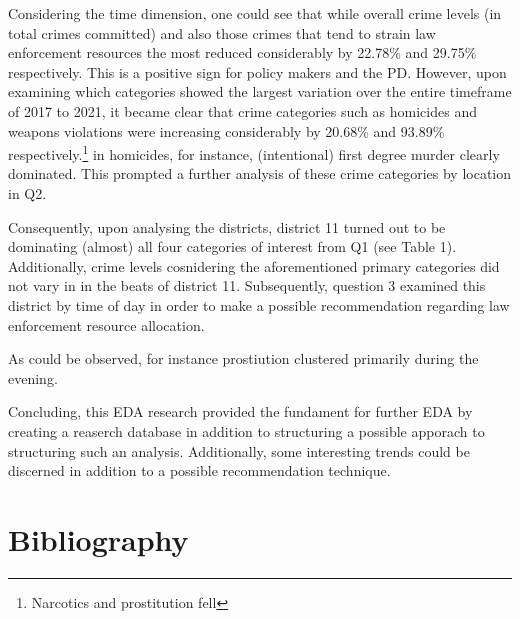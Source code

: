 \documentclass[a4paper]{article}
\begin{document}
\indent Considering the time dimension, one could see that while overall crime levels (in total crimes committed) and also those crimes that tend to strain law enforcement resources the most reduced considerably by 22.78\% and 29.75\% respectively. This is a positive sign for policy makers and the PD. However, upon examining which categories showed the largest variation over the entire timeframe of 2017 to 2021, it became clear that crime categories such as homicides and weapons violations were increasing considerably by 20.68\% and 93.89\% respectively.\footnote{Narcotics and prostitution fell} in homicides, for instance, (intentional) first degree murder clearly dominated. This prompted a further analysis of these crime categories by location in Q2.

\indent Consequently, upon analysing the districts, district 11 turned out to be dominating (almost) all four categories of interest from Q1 (see Table 1). Additionally, crime levels cosnidering the aforementioned primary categories did not vary in in the beats of district 11. Subsequently, question 3 examined this district by time of day in order to make a possible recommendation regarding law enforcement resource allocation.

\indent As could be observed, for instance prostiution clustered primarily during the evening.

Concluding, this EDA research provided the fundament for further EDA by creating a reaserch database in addition to structuring a possible apporach to structuring such an analysis. Additionally, some interesting trends could be discerned in addition to a possible recommendation technique.






\section{Bibliography}
\end{document}
